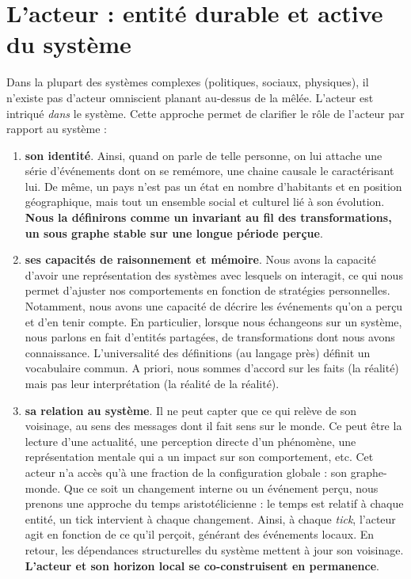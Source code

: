 \documentclass{report}
\begin{document}
	\section{L'acteur : entité durable et active du système} 
	
	Dans la plupart des systèmes complexes (politiques, sociaux, physiques), il n'existe pas d'acteur omniscient planant au-dessus de la mêlée. L'acteur est intriqué \textit{dans} le système. Cette approche permet de clarifier le rôle de l'acteur par rapport au système : 
	\begin{enumerate}
		\item \textbf{son identité}. Ainsi, quand on parle de telle personne, on lui attache une série d'événements dont on se remémore, une chaine causale le caractérisant lui. De même, un pays n'est pas un état en nombre d'habitants et en position géographique, mais tout un ensemble social et culturel lié à son évolution. \textbf{Nous la définirons comme un invariant au fil des transformations, un sous graphe stable sur une longue période perçue}. 
		\item \textbf{ses capacités de raisonnement et mémoire}. Nous avons la capacité d'avoir une représentation des systèmes avec lesquels on interagit, ce qui nous permet d'ajuster nos comportements en fonction de stratégies personnelles. Notamment, nous avons une capacité de décrire les événements qu'on a perçu et d'en tenir compte. En particulier, lorsque nous échangeons sur un système, nous parlons en fait d'entités partagées, de transformations dont nous avons connaissance. L'universalité des définitions (au langage près) définit un vocabulaire commun. A priori, nous sommes d'accord sur les faits (la réalité) mais pas leur interprétation (la réalité de la réalité). 
		\item \textbf{sa relation au système}. Il ne peut capter que ce qui relève de son voisinage, au sens des messages dont il fait sens sur le monde. Ce peut être la lecture d'une actualité, une perception directe d'un phénomène, une représentation mentale qui a un impact sur son comportement, etc. Cet acteur n'a accès qu'à une fraction de la configuration globale : son \og{}graphe-monde\fg{}. Que ce soit un changement interne ou un événement perçu, nous prenons une approche du temps aristotélicienne : le temps est relatif à chaque entité, un tick intervient à chaque changement. Ainsi, à chaque \textit{tick}, l'acteur agit en fonction de ce qu'il perçoit, générant des événements locaux. En retour, les dépendances structurelles du système mettent à jour son voisinage. \textbf{L'acteur et son horizon local se co-construisent en permanence}.
	\end{enumerate}
	
\end{document}
